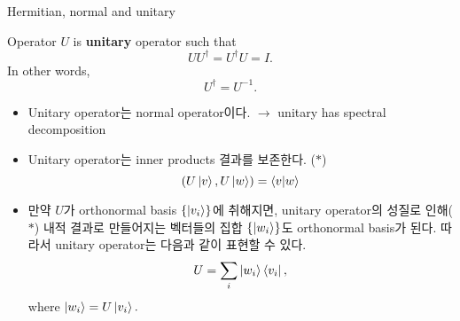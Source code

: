 \documentclass[9pt]{beamer}
\begin{document}
    \begin{frame}{Hermitian, normal and unitary}
        \begin{definition}[Unitary]
            Operator $U$ is \textbf{unitary} operator such that
            $$UU^\dagger = U^\dagger U = I.$$
            In other words,
            $$U^\dagger = U^{-1}.$$
        \end{definition}
        \begin{itemize}
            \item Unitary operator는 normal operator이다. $\rightarrow$ unitary has spectral decomposition
            \item Unitary operator는 inner products 결과를 보존한다. ($\ast$) $$(U\ket v, U \ket w) = \braket{v|w}$$
            \item 만약 $U$가 orthonormal basis $\{\ket{v_i}\}$에 취해지면, unitary operator의 성질로 인해($\ast$) 내적 결과로 만들어지는 벡터들의 집합 $\{ \ket{w_i} \}$도 orthonormal basis가 된다. 따라서 unitary operator는 다음과 같이 표현할 수 있다. 
            $$U = \sum_i \ket{w_i} \bra{v_i},$$
            where $\ket{w_i} = U \ket{v_i}.$ 
        \end{itemize}
    \end{frame}

\end{document}
